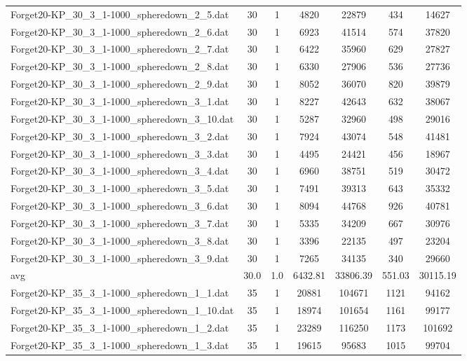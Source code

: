 \begin{table}[!ht]
\begin{tabular}{lcccccc}
Forget20-KP\_30\_3\_1-1000\_spheredown\_2\_5.dat & 30 & 1 & 4820 & 22879 & 434 & 14627 \\
Forget20-KP\_30\_3\_1-1000\_spheredown\_2\_6.dat & 30 & 1 & 6923 & 41514 & 574 & 37820 \\
Forget20-KP\_30\_3\_1-1000\_spheredown\_2\_7.dat & 30 & 1 & 6422 & 35960 & 629 & 27827 \\
Forget20-KP\_30\_3\_1-1000\_spheredown\_2\_8.dat & 30 & 1 & 6330 & 27906 & 536 & 27736 \\
Forget20-KP\_30\_3\_1-1000\_spheredown\_2\_9.dat & 30 & 1 & 8052 & 36070 & 820 & 39879 \\
Forget20-KP\_30\_3\_1-1000\_spheredown\_3\_1.dat & 30 & 1 & 8227 & 42643 & 632 & 38067 \\
Forget20-KP\_30\_3\_1-1000\_spheredown\_3\_10.dat & 30 & 1 & 5287 & 32960 & 498 & 29016 \\
Forget20-KP\_30\_3\_1-1000\_spheredown\_3\_2.dat & 30 & 1 & 7924 & 43074 & 548 & 41481 \\
Forget20-KP\_30\_3\_1-1000\_spheredown\_3\_3.dat & 30 & 1 & 4495 & 24421 & 456 & 18967 \\
Forget20-KP\_30\_3\_1-1000\_spheredown\_3\_4.dat & 30 & 1 & 6960 & 38751 & 519 & 30472 \\
Forget20-KP\_30\_3\_1-1000\_spheredown\_3\_5.dat & 30 & 1 & 7491 & 39313 & 643 & 35332 \\
Forget20-KP\_30\_3\_1-1000\_spheredown\_3\_6.dat & 30 & 1 & 8094 & 44768 & 926 & 40781 \\
Forget20-KP\_30\_3\_1-1000\_spheredown\_3\_7.dat & 30 & 1 & 5335 & 34209 & 667 & 30976 \\
Forget20-KP\_30\_3\_1-1000\_spheredown\_3\_8.dat & 30 & 1 & 3396 & 22135 & 497 & 23204 \\
Forget20-KP\_30\_3\_1-1000\_spheredown\_3\_9.dat & 30 & 1 & 7265 & 34135 & 340 & 29660 \\
\cline{1-9} avg & 30.0 & 1.0 & 6432.81& 33806.39 & 551.03& 30115.19\\ \hline
Forget20-KP\_35\_3\_1-1000\_spheredown\_1\_1.dat & 35 & 1 & 20881 & 104671 & 1121 & 94162 \\
Forget20-KP\_35\_3\_1-1000\_spheredown\_1\_10.dat & 35 & 1 & 18974 & 101654 & 1161 & 99177 \\
Forget20-KP\_35\_3\_1-1000\_spheredown\_1\_2.dat & 35 & 1 & 23289 & 116250 & 1173 & 101692 \\
Forget20-KP\_35\_3\_1-1000\_spheredown\_1\_3.dat & 35 & 1 & 19615 & 95683 & 1015 & 99704 \\

\end{tabular}
\end{table}
